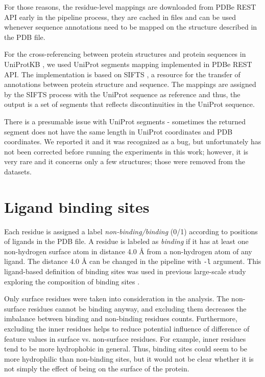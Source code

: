 For those reasons, the residue-level mappings are downloaded from PDBe REST API \cite{pdbe_restapi} early in the pipeline process, they are cached in files and can be used whenever sequence annotations need to be mapped on the structure described in the PDB file.

For the cross-referencing between protein structures and protein sequences in UniProtKB \cite{uniprot}, we used UniProt segments mapping implemented in PDBe REST API. The implementation is based on SIFTS \cite{sifts}, a resource for the transfer of annotations between protein structure and sequence. The mappings are assigned by the SIFTS process with the UniProt sequence as reference and thus, the output is a set of segments that reflects discontinuities in the UniProt sequence.

There is a presumable issue with UniProt segments - sometimes the returned segment does not have the same length in UniProt coordinates and PDB coordinates. We reported it and it was recognized as a bug, but unfortunately has not been corrected before running the experiments in this work; however, it is very rare and it concerns only a few structures; those were removed from the datasets. 

\section{Ligand binding sites}

Each residue is assigned a label \textit{non-binding/binding} (0/1) according to positions of ligands in the PDB file. A residue is labeled as \textit{binding} if it has at least one non-hydrogen surface atom in distance 4.0 {\AA} from a non-hydrogen atom of any ligand. The distance 4.0 {\AA} can be changed in the pipeline with \texttt{-l} argument. This ligand-based definition of binding sites was used in previous large-scale study exploring the composition of binding sites \cite{lbscomposition}.

Only surface residues were taken into consideration in the analysis. The non-surface residues cannot be binding anyway, and excluding them decreases the imbalance between binding and non-binding residues counts. Furthermore, excluding the inner residues helps to reduce potential influence of difference of feature values in surface vs. non-surface residues. For example, inner residues tend to be more hydrophobic in general. Thus, binding sites could seem to be more hydrophilic than non-binding sites, but it would not be clear whether it is not simply the effect of being on the surface of the protein.

